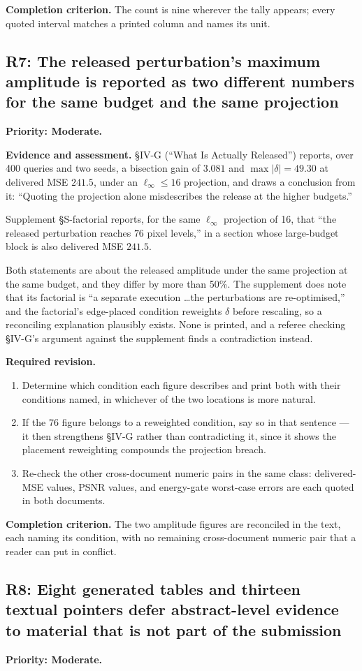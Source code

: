 \documentclass[11pt,a4paper]{article}
\newcommand{\finding}[3]{\subsection{#1: #3}\label{rev:#1}\textbf{Priority: #2.}}
\newcommand{\evidence}{\par\textbf{Evidence and assessment.} }
\newcommand{\action}{\par\textbf{Required revision.} }
\newcommand{\acceptance}{\par\textbf{Completion criterion.} }
\begin{document}
\acceptance
The count is nine wherever the tally appears; every quoted interval matches a
printed column and names its unit.

\finding{R7}{Moderate}{The released perturbation's maximum amplitude is reported
as two different numbers for the same budget and the same projection}

\evidence
\S IV-G (``What Is Actually Released'') reports, over 400 queries and two
seeds, a bisection gain of $3.081$ and $\max\lvert\delta\rvert=49.30$ at
delivered MSE $241.5$, under an $\ell_\infty\le16$ projection, and draws a
conclusion from it: ``Quoting the projection alone misdescribes the release at
the higher budgets.''

Supplement \S S-factorial reports, for the same $\ell_\infty$ projection of 16,
that ``the released perturbation reaches $76$ pixel levels,'' in a section whose
large-budget block is also delivered MSE $241.5$.

Both statements are about the released amplitude under the same projection at
the same budget, and they differ by more than 50\%. The supplement does note
that its factorial is ``a separate execution \ldots the perturbations are
re-optimised,'' and the factorial's edge-placed condition reweights $\delta$
before rescaling, so a reconciling explanation plausibly exists. None is
printed, and a referee checking \S IV-G's argument against the supplement finds
a contradiction instead.

\action
\begin{enumerate}
\item Determine which condition each figure describes and print both with their
  conditions named, in whichever of the two locations is more natural.
\item If the $76$ figure belongs to a reweighted condition, say so in that
  sentence --- it then strengthens \S IV-G rather than contradicting it, since
  it shows the placement reweighting compounds the projection breach.
\item Re-check the other cross-document numeric pairs in the same class:
  delivered-MSE values, PSNR values, and energy-gate worst-case errors are each
  quoted in both documents.
\end{enumerate}

\acceptance
The two amplitude figures are reconciled in the text, each naming its
condition, with no remaining cross-document numeric pair that a reader can put
in conflict.

\finding{R8}{Moderate}{Eight generated tables and thirteen textual pointers
defer abstract-level evidence to material that is not part of the submission}
\end{document}

